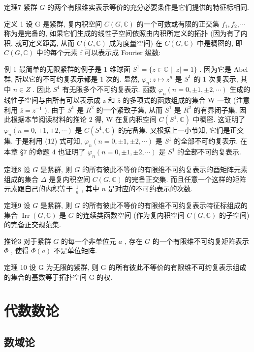 \documentclass[]{article}
\begin{document}
定理7 紧群 $G$ 的两个有限维实表示等价的充分必要条件是它们提供的特征标相同. 

定义 1 设 G 是紧群, 复内积空间 $C(G, \mathbb{C})$ 的一个可数或有限的正交集 $f_{1}, f_{2}, \cdots$ 称为是完备的, 如果它们生成的线性子空间依照由内积所定义的拓扑 (因为有了内积, 就可定义距离, 从而 $C(G, \mathbb{C})$ 成为度量空间) 在 $C(G, \mathbb{C})$ 中是稠密的, 即 $C(G, \mathbb{C})$ 中的每个元素 f 可以表示成 Fourier 级数: 

例 1 最简单的无限紧群的例子是 1 维球面 $S^{1}=\{z\in\mathbb{C}\mid|z|=1\}$ . 因为它是 Abel 群, 所以它的不可约复表示都是 1 次的. 显然, $\varphi_{n}:z\mapsto z^{n}$ 是 $S^{1}$ 的 1 次复表示, 其中 $n\in Z$ . 因此 $S^{1}$ 有无限多个不可约复表示. 函数 $\varphi_{n}(n=0,\pm1,\pm2,\cdots)$ 生成的线性子空间与由所有可以表示成 z 和 $\overline{z}$ 的多项式的函数组成的集合 W 一致 (注意利用 $\overline{z}=z^{-1}$ ). 由于 $S^{1}$ 是 $R^{2}$ 的一个紧致子集, 从而 $S^{1}$ 是 $R^{2}$ 的有界闭子集, 因此根据本节阅读材料的推论 2 得, W 在复内积空间 $C(S^{1},\mathbb{C})$ 中稠密. 这证明了 $\varphi_{n}(n=0,\pm1,\pm2,\cdots)$ 是 $C(S^{1},\mathbb{C})$ 的完备集. 又根据上一小节知, 它们是正交集. 于是利用 (12) 式可知, $\varphi_{n}(n=0,\pm1,\pm2,\cdots)$ 是 $S^{1}$ 的全部不可约复表示. 在本章 §7 的命题 4 也证明了 $\varphi_{n}(n=0,\pm1,\pm2,\cdots)$ 是 $S^{1}$ 的全部不可约复表示. 

定理8 设 $G$ 是紧群, 则 $G$ 的所有彼此不等价的有限维不可约复表示的酉矩阵元素组成的集合 $\Delta$ 是复内积空间 $C(G, \mathbb{C})$ 的完备正交集. 而且任意一个这样的矩阵元素跟自己的内积等于 $\frac{1}{n}$ , 其中 $n$ 是对应的不可约表示的次数. 

定理9 设 $G$ 是紧群, 则 $G$ 的所有彼此不等价的有限维不可约复表示特征标组成的集合 $\operatorname{Irr}(G, \mathbb{C})$ 是 $G$ 的连续类函数空间 (作为复内积空间 $C(G, \mathbb{C})$ 的子空间) 的完备正交规范集. 

推论3 对于紧群 $G$ 的每一个非单位元 $a$ , 存在 $G$ 的一个有限维不可约复矩阵表示 $\Phi$ , 使得 $\Phi(a)$ 不是单位矩阵. 


定理 10 设 G 为无限的紧群, 则 G 的所有彼此不等价的有限维不可约复表示组成的集合的基数等于拓扑空间 G 的权. 

\section{代数数论}

\subsection{数域论}
\end{document}
